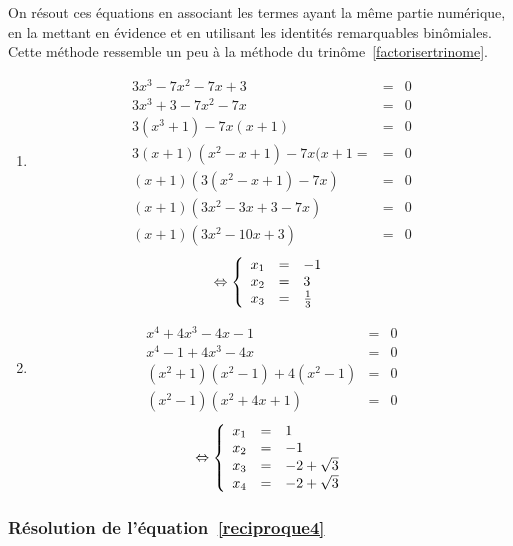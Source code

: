 On résout ces équations en associant les termes ayant la même partie numérique, en la mettant en évidence et en utilisant les identités remarquables binômiales. Cette méthode ressemble un peu à la méthode du trinôme~\ref{factorisertrinome}.

\begin{exemple}
\begin{enumerate}
\item 

\begin{eqnarray*}
3x^3 - 7x^2 - 7x + 3 &=& 0\\
3x^3 + 3 - 7x^2 -7x &=& 0\\
3(x^3+1) - 7x(x+1) &=&0\\
3(x+1)(x^2 - x + 1)-7x(x+1= &=& 0\\
(x+1)\left( 3(x^2 - x + 1)-7x\right) &=& 0\\
(x+1)(3x^2 - 3x+ 3-7x)&=&0\\
(x+1)(3x^2-10x+3)&=&0
\end{eqnarray*}
$$
\Leftrightarrow
\left\{
\begin{array}{lcl}
x_1 &=& -1\\
x_2 &=& 3\\
x_3 &=& \frac{1}{3}
\end{array}
\right.
$$
\item 
\begin{eqnarray*}
x^4+4x^3-4x-1 &=& 0\\
x^4 - 1 + 4x^3 - 4x &=&0 \\
(x^2+1)(x^2-1) + 4(x^2-1) &=& 0\\
(x^2-1)(x^2+ 4x +1)&=&0
\end{eqnarray*}
$$
\Leftrightarrow 
\left\{
\begin{array}{lcl}
x_1 &=& 1\\
x_2 &=& -1\\
x_3 &=& -2+\sqrt{3}\\
x_4 &=& -2+\sqrt{3}
\end{array}
\right.
$$
\end{enumerate}
\end{exemple} 

\subsubsection{Résolution de l'équation~\ref{reciproque4}}

